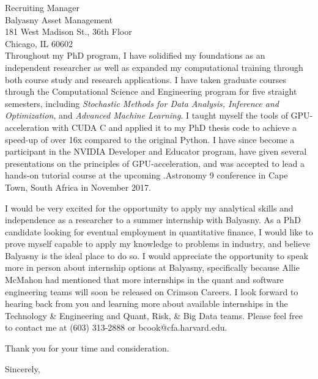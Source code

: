 \documentclass{letter}
\begin{document}
\begin{letter}{Recruiting Manager\\
Balyasny Asset Management\\
181 West Madison St., 36th Floor\\
Chicago, IL 60602\\
}
\noindent Throughout my PhD program, I have solidified my foundations
as an independent researcher as well as expanded my computational
training through both course study and research applications. I have
taken graduate courses through the Computational Science and
Engineering program for five straight semesters, including
\textit{Stochastic Methods for Data Analysis, Inference and
  Optimization}, and \textit{Advanced Machine Learning}. I taught
myself the tools of GPU-acceleration with CUDA C and applied it to my
PhD thesis code to achieve a speed-up of over 16x compared to the
original Python. I have since become a participant in the NVIDIA
Developer and Educator program, have given several presentations on
the principles of GPU-acceleration, and was accepted to lead a
hands-on tutorial course at the upcoming .Astronomy 9 conference in
Cape Town, South Africa in November 2017.

\noindent I would be very excited for the opportunity to apply my
analytical skills and independence as a researcher to a summer
internship with Balyasny. As a PhD candidate looking for eventual
employment in quantitative finance, I would like to prove myself
capable to apply my knowledge to problems in industry, and believe
Balyasny is the ideal place to do so. I would appreciate the
opportunity to speak more in person about internship options at
Balyasny, specifically because Allie McMahon had mentioned that more
internships in the quant and software engineering teams will soon be
released on Crimson Careers. I look forward to hearing back from you
and learning more about available internships in the Technology \&{}
Engineering and Quant, Risk, \&{} Big Data teams. Please feel free to
contact me at (603) 313-2888 or bcook@cfa.harvard.edu.

Thank you for your time and consideration.


\closing{Sincerely,}


\end{letter}
\end{document}
